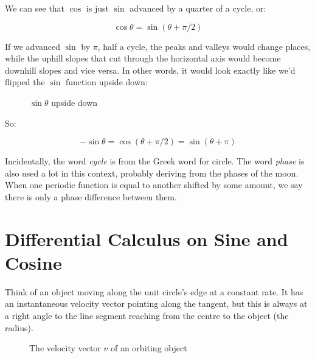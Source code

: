 We can see that $\cos$ is just $\sin$ advanced by a quarter of a cycle, or:

$$
\cos \theta = \sin (\theta + \pi/2)
$$ 

If we advanced $\sin$ by $\pi$, half a cycle, the peaks and valleys would change places, while the uphill slopes that cut through the horizontal axis would become downhill slopes and vice versa. In other words, it would look exactly like we'd flipped the $\sin$ function upside down:

\begin{figure}[h]
    \centering
    \caption{$\sin \theta$ upside down} \label{fig:minus-sin}
\end{figure}

So:

$$
-\sin \theta = \cos (\theta + \pi/2) = \sin (\theta + \pi)
$$

Incidentally, the word \textit{cycle} is from the Greek word for circle. The word \textit{phase} is also used a lot in this context, probably deriving from the phases of the moon. When one periodic function is equal to another shifted by some amount, we say there is only a phase difference between them.

\section{Differential Calculus on Sine and Cosine}

Think of an object moving along the unit circle's edge at a constant rate. It has an instantaneous velocity vector pointing along the tangent, but this is always at a right angle to the line segment reaching from the centre to the object (the radius).

\begin{figure}[h]
    \centering
    \caption{The velocity vector $v$ of an orbiting object} \label{fig:circle-tangent}
\end{figure}


